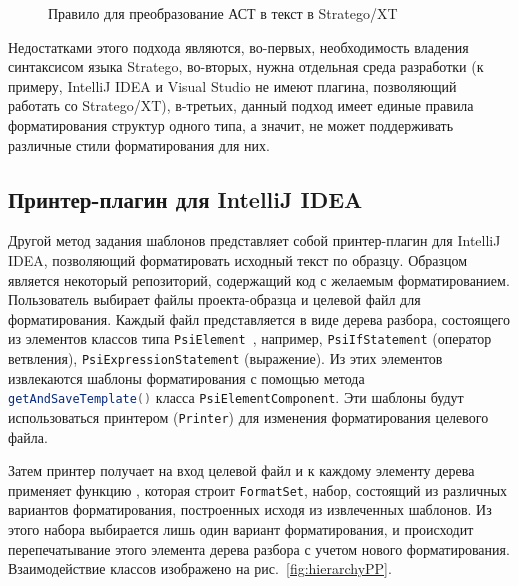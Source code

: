 

\begin{figure}[h]
	\centering
	
	\caption{Правило для преобразование АСТ в текст в Stratego/XT}
	\label{fig:strategopp}
\end{figure}


Недостатками этого подхода являются, во-первых, необходимость владения синтаксисом языка Stratego, во-вторых, нужна отдельная среда разработки (к примеру, IntelliJ IDEA и Visual Studio не имеют плагина, позволяющий работать со Stratego/XT), в-третьих, данный подход имеет единые правила форматирования структур одного типа, а значит, не может поддерживать различные стили форматирования для них.

\subsection{Принтер-плагин для IntelliJ IDEA}
Другой метод задания шаблонов представляет собой принтер-плагин для IntelliJ IDEA, позволяющий форматировать исходный текст по образцу. Образцом является некоторый репозиторий, содержащий код с желаемым форматированием.
Пользователь выбирает файлы проекта-образца и целевой файл для форматирования. Каждый файл представляется в виде дерева разбора, состоящего из элементов классов типа \lstinline[language=Java]{PsiElement}~\cite{intellij:plugdev}, например, \lstinline[language=Java]{PsiIfStatement} (оператор ветвления), \lstinline[language=Java]{PsiExpressionStatement} (выражение). Из этих элементов извлекаются шаблоны 
форматирования с помощью метода \lstinline[language=Java]{getAndSaveTemplate()} 
класса \lstinline[language=Java]{PsiElementComponent}. Эти шаблоны будут 
использоваться принтером (\lstinline[language=Java]{Printer}) для изменения 
форматирования целевого файла.

Затем принтер получает на вход целевой файл и к каждому элементу дерева 
применяет функцию%
, которая строит 
\lstinline[language=Java]{FormatSet}, набор, состоящий из различных вариантов 
форматирования, построенных исходя из извлеченных шаблонов. Из этого набора
выбирается лишь один вариант форматирования, и происходит перепечатывание
этого элемента дерева разбора с учетом нового форматирования.
Взаимодействие классов изображено на рис.~\ref{fig:hierarchyPP}.

